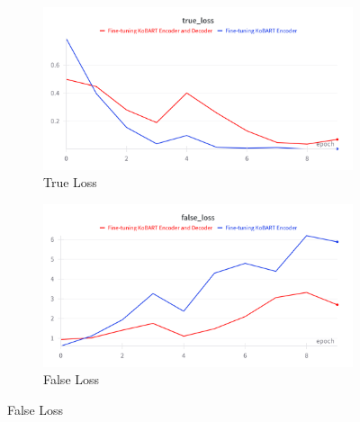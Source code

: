 \documentclass[a4paper,fleqn]{cas-sc}
\begin{document}
\begin{figure}[htbp]
    \centering
    
    \begin{subfigure}[b]{0.4\textwidth}
        \centering
        \includegraphics[width=\textwidth]{1_true_loss.png}
        \caption{True Loss}
        \label{fig:acc}
    \end{subfigure}
    \hspace{0.02\textwidth}
    \begin{subfigure}[b]{0.4\textwidth}
        \centering
        \includegraphics[width=\textwidth]{1_false_loss.png}
        \caption{False Loss}
        \label{fig:loss}
    \end{subfigure}
    

\end{figure}
\end{document}
